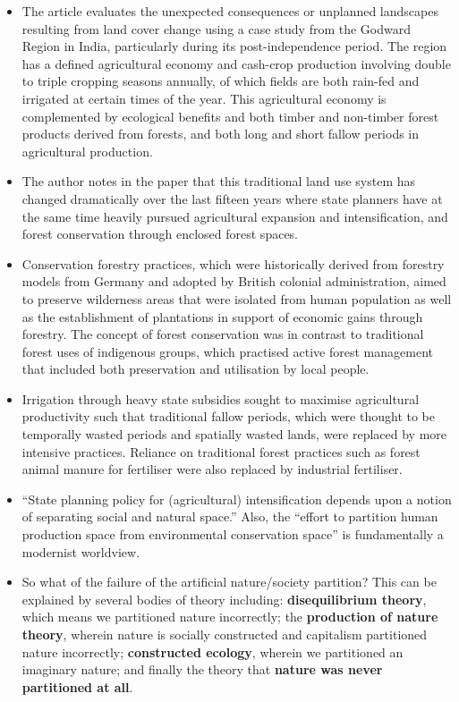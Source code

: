 \documentclass[a4paper, 10.5pt]{article} %
\begin{document}
\begin{itemize}
  \item The article evaluates the unexpected consequences or unplanned landscapes resulting from land cover change using a case study from the Godward Region in India, particularly during its post-independence period. The region has a defined agricultural economy and cash-crop production involving double to triple cropping seasons annually, of which fields are both rain-fed and irrigated at certain times of the year. This agricultural economy is complemented by ecological benefits and both timber and non-timber forest products derived from forests, and both long and short fallow periods in agricultural production.
  \item The author notes in the paper that this traditional land use system has changed dramatically over the last fifteen years where state planners have at the same time heavily pursued agricultural expansion and intensification, and forest conservation through enclosed forest spaces.
  \item Conservation forestry practices, which were historically derived from forestry models from Germany and adopted by British colonial administration, aimed to preserve wilderness areas that were isolated from human population as well as the establishment of plantations in support of economic gains through forestry. The concept of forest conservation was in contrast to traditional forest uses of indigenous groups, which practised active forest management that included both preservation and utilisation by local people.
  \item Irrigation through heavy state subsidies sought to maximise agricultural productivity such that traditional fallow periods, which were thought to be temporally wasted periods and spatially wasted lands, were replaced by more intensive practices. Reliance on traditional forest practices such as forest animal manure for fertiliser were also replaced by industrial fertiliser.
  \item \enquote{State planning policy for (agricultural) intensification depends upon a notion of separating social and natural space.} Also, the \enquote{effort to partition human production space from environmental conservation space} is fundamentally a modernist worldview.
  \item So what of the failure of the artificial nature/society partition? This can be explained by several bodies of theory including: \textbf{disequilibrium theory}, which means we partitioned nature incorrectly; the \textbf{production of nature theory}, wherein nature is socially constructed and capitalism partitioned nature incorrectly; \textbf{constructed ecology}, wherein we partitioned an imaginary nature; and finally the theory that \textbf{nature was never partitioned at all}.
\end{itemize}
\end{document}
